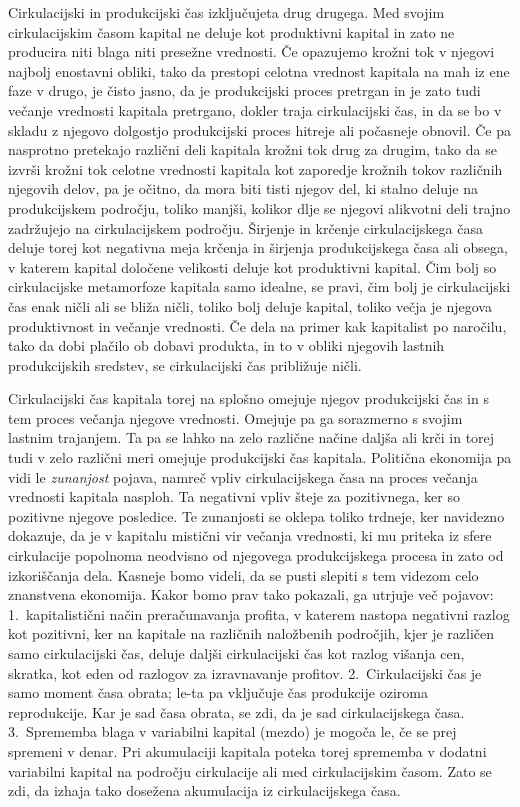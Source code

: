 \documentclass[kapital_02.tex]{subfiles}
\begin{document}
Cirkulacijski \KPEstran in produkcijski čas izključujeta drug drugega. Med svojim cirkulacijskim časom kapital ne deluje kot produktivni kapital in zato ne producira niti blaga niti presežne vrednosti. Če opazujemo krožni tok v njegovi najbolj enostavni obliki, tako da prestopi celotna vrednost kapitala na mah iz ene faze v drugo, je čisto jasno, da je produkcijski proces pretrgan in je zato tudi večanje vrednosti kapitala pretrgano, dokler traja cirkulacijski čas, in da se bo v skladu z njegovo dolgostjo produkcijski proces hitreje ali počasneje obnovil. Če pa nasprotno pretekajo različni deli kapitala krožni tok drug za drugim, tako da se izvrši krožni tok celotne vrednosti kapitala kot zaporedje krožnih tokov različnih njegovih delov, pa je očitno, da mora biti tisti njegov del, ki stalno deluje na produkcijskem področju, toliko manjši, kolikor dlje se njegovi alikvotni deli trajno zadržujejo na cirkulacijskem področju. Širjenje in krčenje cirkulacijskega časa deluje torej kot negativna meja krčenja in širjenja produkcijskega časa ali obsega, v katerem kapital določene velikosti deluje kot produktivni kapital. Čim bolj so cirkulacijske metamorfoze kapitala samo idealne, se pravi, čim bolj je cirkulacijski čas enak ničli ali se bliža ničli, toliko bolj deluje kapital, toliko večja je njegova produktivnost in večanje vrednosti. Če dela na primer kak kapitalist po naročilu, tako da dobi plačilo ob dobavi produkta, in to v obliki njegovih lastnih produkcijskih sredstev, se cirkulacijski čas približuje ničli.

Cirkulacijski čas kapitala torej na splošno omejuje njegov produkcijski čas in s tem proces večanja njegove vrednosti. Omejuje pa ga sorazmerno s svojim lastnim trajanjem. Ta pa se lahko na zelo različne načine daljša ali krči in torej tudi v zelo različni meri omejuje produkcijski čas kapitala. Politična ekonomija pa vidi le \emph{zunanjost} pojava, namreč vpliv cirkulacijskega časa na proces večanja vrednosti kapitala nasploh. Ta negativni vpliv šteje za pozitivnega, ker so pozitivne njegove posledice. Te zunanjosti se oklepa toliko trdneje, ker navidezno dokazuje, da je v kapitalu mistični vir večanja vrednosti, ki mu priteka iz sfere cirkulacije popolnoma neodvisno od njegovega produkcijskega \KPEstran procesa in zato od izkoriščanja dela. Kasneje bomo videli, da se pusti slepiti s tem videzom celo znanstvena ekonomija. Kakor bomo prav tako pokazali, ga utrjuje več pojavov: 1.\ kapitalistični način preračunavanja profita, v katerem nastopa negativni razlog kot pozitivni, ker na kapitale na različnih naložbenih področjih, kjer je različen samo cirkulacijski čas, deluje daljši cirkulacijski čas kot razlog višanja cen, skratka, kot eden od razlogov za izravnavanje profitov. 2.\ Cirkulacijski čas je samo moment časa obrata; le-ta pa vključuje čas produkcije oziroma reprodukcije. Kar je sad časa obrata, se zdi, da je sad cirkulacijskega časa. 3.\ Sprememba blaga v variabilni kapital (mezdo) je mogoča le, če se prej spremeni v denar. Pri akumulaciji kapitala poteka torej sprememba v dodatni variabilni kapital na področju cirkulacije ali med cirkulacijskim časom. Zato se zdi, da izhaja tako dosežena akumulacija iz cirkulacijskega časa.
\end{document}
